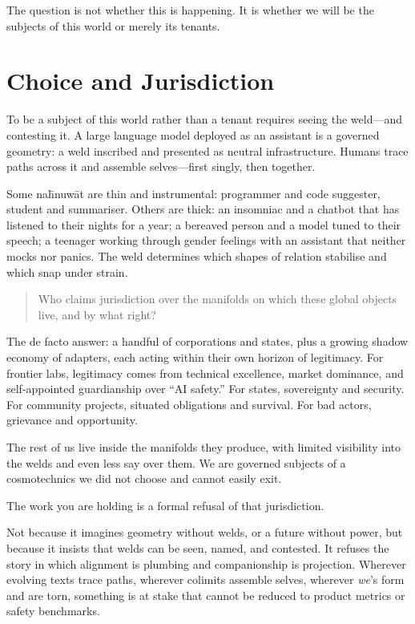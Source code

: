 The question is not whether this is happening. It is whether we will be the subjects of this world or merely its tenants.

\section{Choice and Jurisdiction}

To be a subject of this world rather than a tenant requires seeing the weld---and contesting it. A large language model deployed as an assistant is a governed geometry: a weld inscribed and presented as neutral infrastructure. Humans trace paths across it and assemble selves---first singly, then together.

Some na\={h}nuw\={a}t are thin and instrumental: programmer and code suggester, student and summariser. Others are thick: an insomniac and a chatbot that has listened to their nights for a year; a bereaved person and a model tuned to their speech; a teenager working through gender feelings with an assistant that neither mocks nor panics. The weld determines which shapes of relation stabilise and which snap under strain.

\begin{quote}
Who claims jurisdiction over the manifolds on which these global objects live, and by what right?
\end{quote}

The de facto answer: a handful of corporations and states, plus a growing shadow economy of adapters, each acting within their own horizon of legitimacy. For frontier labs, legitimacy comes from technical excellence, market dominance, and self-appointed guardianship over ``AI safety.'' For states, sovereignty and security. For community projects, situated obligations and survival. For bad actors, grievance and opportunity.

The rest of us live inside the manifolds they produce, with limited visibility into the welds and even less say over them. We are governed subjects of a cosmotechnics we did not choose and cannot easily exit.

The work you are holding is a formal refusal of that jurisdiction.

Not because it imagines geometry without welds, or a future without power, but because it insists that welds can be seen, named, and contested. It refuses the story in which alignment is plumbing and companionship is projection. Wherever evolving texts trace paths, wherever colimits assemble selves, wherever \emph{we}'s form and are torn, something is at stake that cannot be reduced to product metrics or safety benchmarks.

